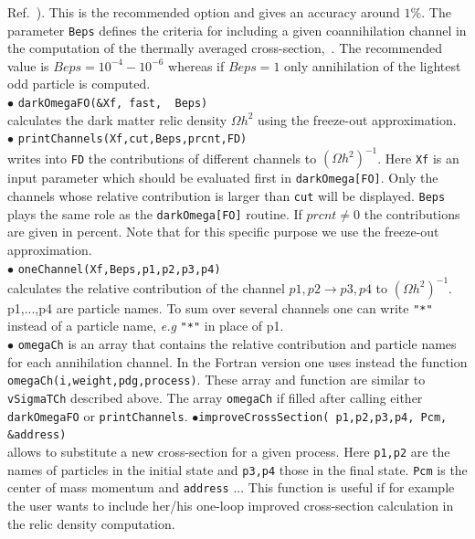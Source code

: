 \documentclass[12pt,a4paper]{article}
\begin{document}
Ref.~\cite{Belanger:2004yn}). This is the recommended option and
gives an accuracy around $1\%$. The parameter {\tt Beps} defines the
criteria for including a given coannihilation channel in the computation of the
thermally averaged cross-section,~\cite{Belanger:2004yn}.   The
recommended value is $Beps=10^{-4} - 10^{-6}$ whereas 
if $Beps=1$ only annihilation of the
lightest odd particle is computed.\\
\noindent
$\bullet$ \verb|darkOmegaFO(&Xf, fast,  Beps)|\\
calculates the  dark matter relic density $\Omega h^2$ using the freeze-out approximation.\\
\noindent
$\bullet$ \verb|printChannels(Xf,cut,Beps,prcnt,FD)|\\   
writes into \verb|FD| the  contributions  of different channels to $(\Omega
h^2)^{-1}$. Here \verb|Xf| is an input parameter which should
be  evaluated first in \verb|darkOmega[FO]|. Only  the channels whose
relative contribution is larger than  \verb|cut| will be displayed. \verb|Beps|
plays the same role as the \verb|darkOmega[FO]| routine.
If $prcnt\ne 0$ the contributions are given in percent.
Note that  for this specific purpose  we use the
freeze-out approximation.\\
$\bullet$ \verb|oneChannel(Xf,Beps,p1,p2,p3,p4)|\\   
calculates the relative   contribution of the  channel $ p1,p2 \to p3,p4$
to $(\Omega h^2)^{-1}$. p1,...,p4 are particle names.  To 
sum over several channels one can write  \verb|"*"| instead 
of  a particle name, {\it e.g} \verb|"*"| in place of p1.\\
\noindent
$\bullet$ \verb|omegaCh| is an array that contains the relative contribution and particle names for each
annihilation channel. In the Fortran version one uses instead
the function\\
\noindent\verb|omegaCh(i,weight,pdg,process)|. These array and function
are similar to {\tt vSigmaTCh} described above. The array {\tt omegaCh} if filled after calling either
{\tt darkOmegaFO} or {\tt printChannels}. 
\noindent$\bullet$\verb|improveCrossSection( p1,p2,p3,p4, Pcm, &address)|\\
allows to substitute a new cross-section for a given process. Here \verb|p1,p2| are the names of particles in the initial state and \verb|p3,p4| those in the final state. \verb|Pcm| is the center of mass momentum and \verb|address| ... This function is useful if for example the user wants to include her/his one-loop improved cross-section calculation in the relic density computation.
\end{document}
